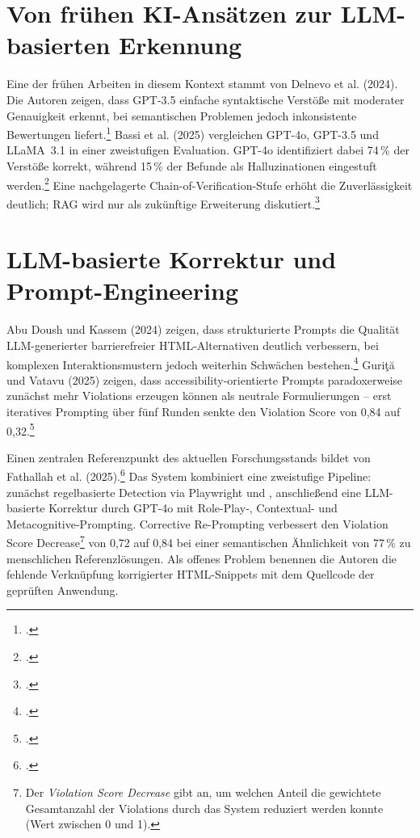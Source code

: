 \section{Von frühen \acs{KI}-Ansätzen zur \acs{LLM}-basierten Erkennung}

Eine der frühen Arbeiten in diesem Kontext stammt von Delnevo et al. (2024). Die Autoren zeigen, dass GPT-3.5 einfache syntaktische Verstöße mit moderater Genauigkeit erkennt, bei semantischen Problemen jedoch inkonsistente Bewertungen liefert.\footcite[Vgl.][]{delnevo_interaction_2024} Bassi et al. (2025) vergleichen GPT-4o, GPT-3.5 und LLaMA~3.1 in einer zweistufigen Evaluation. GPT-4o identifiziert dabei 74\,\% der Verstöße korrekt, während 15\,\% der Befunde als Halluzinationen eingestuft werden.\footcite[Vgl.][S. 302]{bassi_assessment_2025} Eine nachgelagerte Chain-of-Verification-Stufe erhöht die Zuverlässigkeit deutlich; \ac{RAG} wird nur als zukünftige Erweiterung diskutiert.\footcite[Vgl.][S. 301]{bassi_assessment_2025}

\section{\acs{LLM}-basierte Korrektur und Prompt-Engineering}

Abu Doush und Kassem (2024) zeigen, dass strukturierte Prompts die Qualität \ac{LLM}-generierter barrierefreier \acs{HTML}-Alternativen deutlich verbessern, bei komplexen Interaktionsmustern jedoch weiterhin Schwächen bestehen.\footcite[Vgl.][S. 343]{doush_evaluating_2025} Guri{\c{t}}{\u{a}} und Vatavu (2025) zeigen, dass accessibility-orientierte Prompts paradoxerweise zunächst mehr Violations erzeugen können als neutrale Formulierungen -- erst iteratives Prompting über fünf Runden senkte den Violation Score von 0,84 auf 0,32.\footcite[Vgl.][S. 1000]{gurita_insights_2025}

Einen zentralen Referenzpunkt des aktuellen Forschungsstands bildet  von \mbox{Fathallah} et al. (2025).\footcite[Vgl.][]{fathallah_accessguru_2025} Das System kombiniert eine zweistufige Pipeline: zunächst regelbasierte Detection via Playwright und , anschließend eine \ac{LLM}-basierte Korrektur durch \mbox{GPT-4o} mit Role-Play-, Contextual- und Metacognitive-Prompting. Corrective Re-Prompting verbessert den Violation Score Decrease\footnote{Der \textit{Violation Score Decrease} gibt an, um welchen Anteil die gewichtete Gesamtanzahl der Violations durch das System reduziert werden konnte (Wert zwischen 0 und 1).} von 0,72 auf 0,84 bei einer semantischen Ähnlichkeit von 77\,\% zu menschlichen Referenzlösungen. Als offenes Problem benennen die Autoren die fehlende Verknüpfung korrigierter \acs{HTML}-Snippets mit dem Quellcode der geprüften Anwendung.

